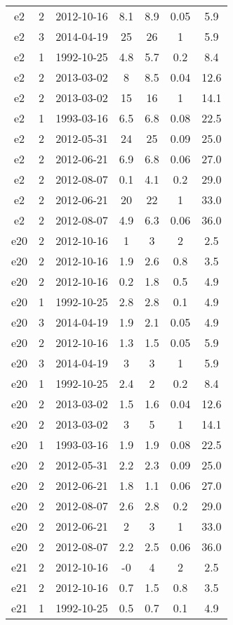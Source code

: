 \begin{table*}[htp]
\begin{tabular}{ccccccc}
e2 & 2 & 2012-10-16 & 8.1 & 8.9 & 0.05 & 5.9 \\
e2 & 3 & 2014-04-19 & 25 & 26 & 1 & 5.9 \\
e2 & 1 & 1992-10-25 & 4.8 & 5.7 & 0.2 & 8.4 \\
e2 & 2 & 2013-03-02 & 8 & 8.5 & 0.04 & 12.6 \\
e2 & 2 & 2013-03-02 & 15 & 16 & 1 & 14.1 \\
e2 & 1 & 1993-03-16 & 6.5 & 6.8 & 0.08 & 22.5 \\
e2 & 2 & 2012-05-31 & 24 & 25 & 0.09 & 25.0 \\
e2 & 2 & 2012-06-21 & 6.9 & 6.8 & 0.06 & 27.0 \\
e2 & 2 & 2012-08-07 & 0.1 & 4.1 & 0.2 & 29.0 \\
e2 & 2 & 2012-06-21 & 20 & 22 & 1 & 33.0 \\
e2 & 2 & 2012-08-07 & 4.9 & 6.3 & 0.06 & 36.0 \\
e20 & 2 & 2012-10-16 & 1 & 3 & 2 & 2.5 \\
e20 & 2 & 2012-10-16 & 1.9 & 2.6 & 0.8 & 3.5 \\
e20 & 2 & 2012-10-16 & 0.2 & 1.8 & 0.5 & 4.9 \\
e20 & 1 & 1992-10-25 & 2.8 & 2.8 & 0.1 & 4.9 \\
e20 & 3 & 2014-04-19 & 1.9 & 2.1 & 0.05 & 4.9 \\
e20 & 2 & 2012-10-16 & 1.3 & 1.5 & 0.05 & 5.9 \\
e20 & 3 & 2014-04-19 & 3 & 3 & 1 & 5.9 \\
e20 & 1 & 1992-10-25 & 2.4 & 2 & 0.2 & 8.4 \\
e20 & 2 & 2013-03-02 & 1.5 & 1.6 & 0.04 & 12.6 \\
e20 & 2 & 2013-03-02 & 3 & 5 & 1 & 14.1 \\
e20 & 1 & 1993-03-16 & 1.9 & 1.9 & 0.08 & 22.5 \\
e20 & 2 & 2012-05-31 & 2.2 & 2.3 & 0.09 & 25.0 \\
e20 & 2 & 2012-06-21 & 1.8 & 1.1 & 0.06 & 27.0 \\
e20 & 2 & 2012-08-07 & 2.6 & 2.8 & 0.2 & 29.0 \\
e20 & 2 & 2012-06-21 & 2 & 3 & 1 & 33.0 \\
e20 & 2 & 2012-08-07 & 2.2 & 2.5 & 0.06 & 36.0 \\
e21 & 2 & 2012-10-16 & -0 & 4 & 2 & 2.5 \\
e21 & 2 & 2012-10-16 & 0.7 & 1.5 & 0.8 & 3.5 \\
e21 & 1 & 1992-10-25 & 0.5 & 0.7 & 0.1 & 4.9 \\

\end{tabular}
\end{table*}
